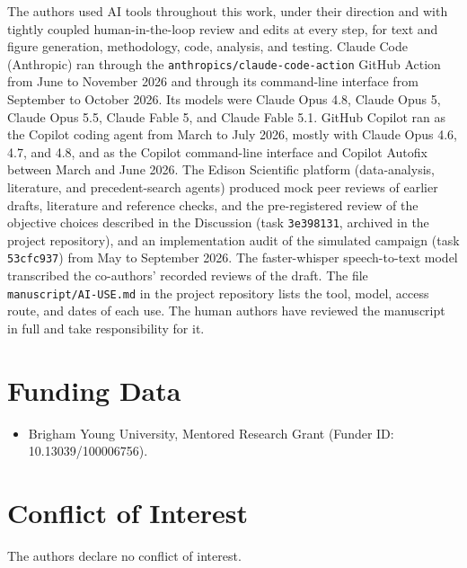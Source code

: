 \documentclass[lineno,nocopyright,upint,varvw,hyphenate]{asmejour}
\begin{document}
The authors used AI tools throughout this work, under their direction
and with tightly coupled human-in-the-loop review and edits at every
step, for text and figure generation, methodology, code, analysis, and
testing. Claude Code (Anthropic) ran through the
\texttt{anthropics/claude-code-action} GitHub Action from June to
November 2026 and through its command-line interface from September to
October 2026. Its models were Claude Opus 4.8, Claude Opus 5, Claude
Opus 5.5, Claude Fable 5, and Claude Fable 5.1. GitHub Copilot ran as
the Copilot coding agent from March to July 2026, mostly with Claude
Opus 4.6, 4.7, and 4.8, and as the Copilot command-line interface and
Copilot Autofix between March and June 2026. The Edison Scientific
platform (data-analysis, literature, and precedent-search agents)
produced mock peer reviews of earlier drafts, literature and reference
checks, and the pre-registered review of the objective choices
described in the Discussion (task \texttt{3e398131}, archived in the
project repository), and an implementation audit of the simulated
campaign (task \texttt{53cfc937}) from May to September 2026. The faster-whisper speech-to-text model
transcribed the co-authors' recorded reviews of the draft. The file
\texttt{manuscript/AI-USE.md} in the project repository lists the
tool, model, access route, and dates of each use. The human authors
have reviewed the manuscript in full and take responsibility
for it.

\section*{Funding Data}
\begin{itemize}
  \item Brigham Young University, Mentored Research Grant (Funder ID:
    10.13039/100006756).
\end{itemize}

\section*{Conflict of Interest}
The authors declare no conflict of interest.
\end{document}
